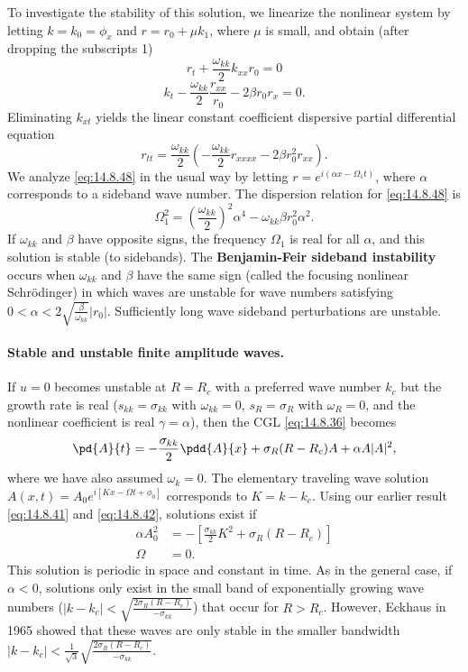 To investigate the stability of this solution, we linearize the nonlinear system by letting $k = k_0 = \phi_x$ and $r = r_0 + \mu k_1$, where $\mu$ is small, and obtain (after dropping the subscripts 1)
\begin{equation}
r_t + \frac{\omega_{kk}}{2}k_{xx}r_0 = 0 \label{eq:14.8.46}
\end{equation}
\begin{equation}
k_t - \frac{\omega_{kk}}{2}\frac{r_{xx}}{r_0} - 2\beta r_0 r_x = 0. \label{eq:14.8.47}
\end{equation}
Eliminating $k_{xt}$ yields the linear constant coefficient dispersive partial differential equation
\begin{equation}
r_{tt} = \frac{\omega_{kk}}{2}\left(-\frac{\omega_{kk}}{2}r_{xxxx} - 2\beta r_0^2 r_{xx}\right).
\label{eq:14.8.48}
\end{equation}
We analyze \eqref{eq:14.8.48} in the usual way by letting $r = e^{i(\alpha x - \Omega_1 t)}$, where $\alpha$ corresponds to a sideband wave number. The dispersion relation for \eqref{eq:14.8.48} is
\[
\Omega_1^2 = \left(\frac{\omega_{kk}}{2}\right)^2\alpha^4 - \omega_{kk}\beta r_0^2\alpha^2.
\]
If $\omega_{kk}$ and $\beta$ have opposite signs, the frequency $\Omega_1$ is real for all $\alpha$, and this solution is stable (to sidebands). The \textbf{Benjamin-Feir sideband instability} occurs when $\omega_{kk}$ and $\beta$ have the same sign (called the focusing nonlinear Schr\"odinger) in which waves are unstable for wave numbers satisfying $0 < \alpha < 2\sqrt{\frac{\beta}{\omega_{kk}}}|r_0|$. Sufficiently long wave sideband perturbations are unstable.

\paragraph{Stable and unstable finite amplitude waves.}
If $u = 0$ becomes unstable at $R = R_c$ with a preferred wave number $k_c$ but the growth rate is real ($s_{kk} = \sigma_{kk}$ with $\omega_{kk} = 0$, $s_R = \sigma_R$ with $\omega_R = 0$, and the nonlinear coefficient is real $\gamma = \alpha$), then the CGL \eqref{eq:14.8.36} becomes
\[
\pd{A}{t} = -\frac{\sigma_{kk}}{2}\pdd{A}{x} + \sigma_R(R - R_c)A + \alpha A|A|^2,
\]
where we have also assumed $\omega_k = 0$. The elementary traveling wave solution $A(x,t) = A_0 e^{i[Kx - \Omega t + \phi_0]}$ corresponds to $K = k - k_c$. Using our earlier result \eqref{eq:14.8.41} and \eqref{eq:14.8.42}, solutions exist if
\begin{align}
\alpha A_0^2 &= -[\frac{\sigma_{kk}}{2}K^2 + \sigma_R(R - R_c)] \label{eq:14.8.49} \\
\Omega &= 0. \label{eq:14.8.50}
\end{align}
This solution is periodic in space and constant in time. As in the general case, if $\alpha < 0$, solutions only exist in the small band of exponentially growing wave numbers ($|k - k_c| < \sqrt{\frac{2\sigma_R(R-R_c)}{-\sigma_{kk}}}$) that occur for $R > R_c$. However, Eckhaus in 1965 showed that these waves are only stable in the smaller bandwidth $|k - k_c| < \frac{1}{\sqrt{3}}\sqrt{\frac{2\sigma_R(R-R_c)}{-\sigma_{kk}}}$.


